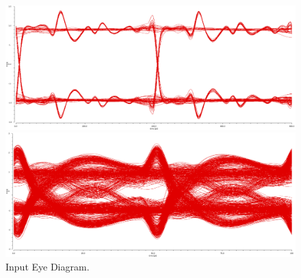 \documentclass{book}  %
\begin{document}
\begin{paper}
\begin{figure}[htbp!]
	\centering	
	\begin{minipage}[tb]{0.5\textwidth}
		\centering	
		\includegraphics[height=0.15\textheight]{./img/channel_response_eye_diagram/input_differential_eye_3gbp.png}
	\end{minipage}%
	\begin{minipage}[tb]{0.5\textwidth}
		\centering	
		\includegraphics[height=0.15\textheight]{./img/channel_response_eye_diagram/input_differential_eye_20gbp.png}
	\end{minipage}
	\caption{Input Eye Diagram.}
	\label{fig:input_differential_eye}
\end{figure}


\end{paper}
\end{document}
